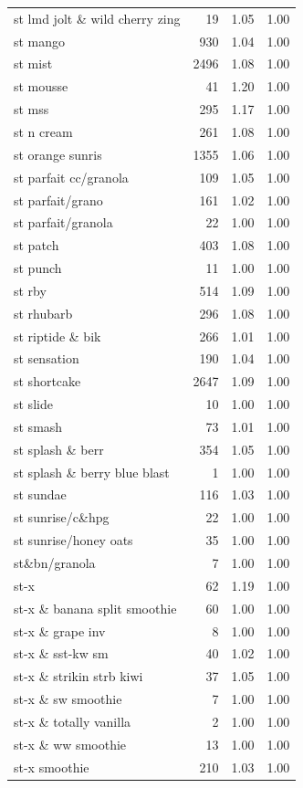 \begin{table}
\begin{tabular}{lrrr}
st lmd jolt \& wild cherry zing & 19 & 1.05 & 1.00 \\
st mango & 930 & 1.04 & 1.00 \\
st mist & 2496 & 1.08 & 1.00 \\
st mousse & 41 & 1.20 & 1.00 \\
st mss & 295 & 1.17 & 1.00 \\
st n cream & 261 & 1.08 & 1.00 \\
st orange sunris & 1355 & 1.06 & 1.00 \\
st parfait cc/granola & 109 & 1.05 & 1.00 \\
st parfait/grano & 161 & 1.02 & 1.00 \\
st parfait/granola & 22 & 1.00 & 1.00 \\
st patch & 403 & 1.08 & 1.00 \\
st punch & 11 & 1.00 & 1.00 \\
st rby & 514 & 1.09 & 1.00 \\
st rhubarb & 296 & 1.08 & 1.00 \\
st riptide \& bik & 266 & 1.01 & 1.00 \\
st sensation & 190 & 1.04 & 1.00 \\
st shortcake & 2647 & 1.09 & 1.00 \\
st slide & 10 & 1.00 & 1.00 \\
st smash & 73 & 1.01 & 1.00 \\
st splash \& berr & 354 & 1.05 & 1.00 \\
st splash \& berry blue blast & 1 & 1.00 & 1.00 \\
st sundae & 116 & 1.03 & 1.00 \\
st sunrise/c\&hpg & 22 & 1.00 & 1.00 \\
st sunrise/honey oats & 35 & 1.00 & 1.00 \\
st\&bn/granola & 7 & 1.00 & 1.00 \\
st-x & 62 & 1.19 & 1.00 \\
st-x \& banana split smoothie & 60 & 1.00 & 1.00 \\
st-x \& grape inv & 8 & 1.00 & 1.00 \\
st-x \& sst-kw sm & 40 & 1.02 & 1.00 \\
st-x \& strikin strb kiwi & 37 & 1.05 & 1.00 \\
st-x \& sw smoothie & 7 & 1.00 & 1.00 \\
st-x \& totally vanilla & 2 & 1.00 & 1.00 \\
st-x \& ww smoothie & 13 & 1.00 & 1.00 \\
st-x smoothie & 210 & 1.03 & 1.00 \\

\end{tabular}
\end{table}
